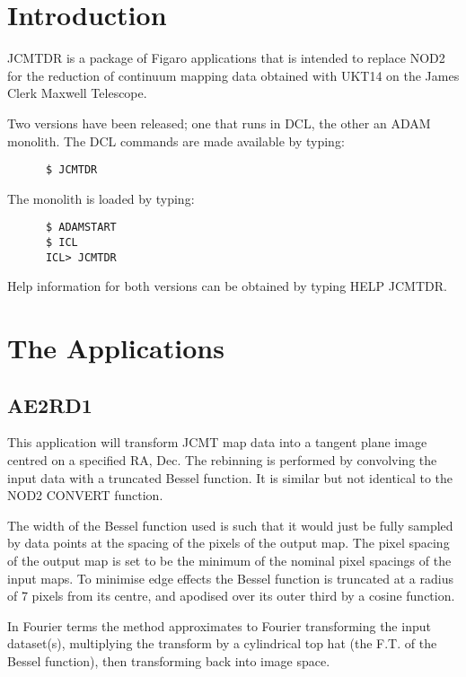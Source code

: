 \newpage

\section{Introduction}

JCMTDR is a package of Figaro applications that is intended to replace
NOD2 for the reduction of continuum mapping data obtained with UKT14
on the James Clerk Maxwell Telescope.

Two versions have been released; one that runs in DCL, the other an
ADAM monolith. The DCL commands are made available by typing:

\begin{verbatim}
      $ JCMTDR
\end{verbatim}

The monolith is loaded by typing:

\begin{verbatim}
      $ ADAMSTART
      $ ICL
      ICL> JCMTDR
\end{verbatim}

Help information for both versions can be obtained by typing HELP
JCMTDR.

\section {The Applications}

\subsection{AE2RD1}

This application will transform JCMT map data into a tangent  plane
image centred on a specified RA, Dec. The rebinning is performed by
convolving the input data with a truncated Bessel function. It is
similar but not identical to the NOD2 CONVERT function. 

The width of the Bessel function used is such that it would just be
fully  sampled by data points at the spacing of the pixels of the
output  map. The pixel spacing of the output map is set to be the
minimum  of the nominal pixel spacings of the input maps. To minimise
edge  effects the Bessel function is truncated at a radius of 7 pixels 
from its centre, and apodised over its outer third by a cosine 
function.

In Fourier terms the method approximates to Fourier transforming the
input dataset(s), multiplying the transform by a cylindrical top hat
(the F.T. of the Bessel function), then transforming back into image
space. 

